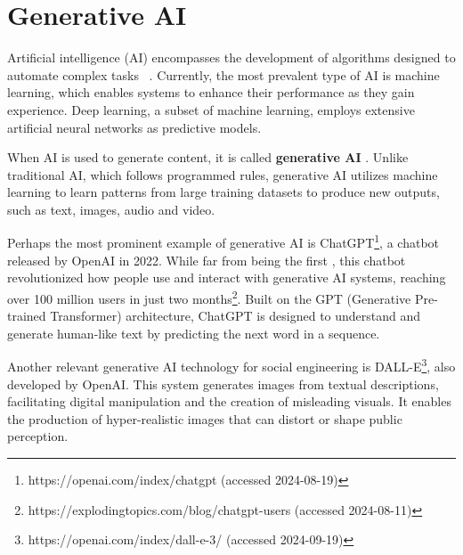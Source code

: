 \section{Generative AI}
\begin{comment}

Artificial Intelligence, Generative AI (ChatGPT, etc)

What to cover:
    - Mitä tekoäly oikeastaan edes on?
    - What is Generative AI
    - OpenAI releasing ChatGPT to the public in 2022
    - NLP Natural Language Processing
    
What to skip:
    - GPT:n historian (versiot 1, 2, 3, 3.5 jne) eli keskitytään vain GPT versioon 4 ja uudempiiin
    
\end{comment}

Artificial intelligence (AI) encompasses the development of algorithms designed to automate complex tasks ~\citep{mirsky_Threat_Offensive_AI_Organizations_2023}. Currently, the most prevalent type of AI is machine learning, which enables systems to enhance their performance as they gain experience. Deep learning, a subset of machine learning, employs extensive artificial neural networks as predictive models.

When AI is used to generate content, it is called \textbf{generative AI} \citep{goodfellow_Generative_Adversarial_Networks_2020}. Unlike traditional AI, which follows programmed rules, generative AI utilizes machine learning to learn patterns from large training datasets to produce new outputs, such as text, images, audio and video.

Perhaps the most prominent example of generative AI is ChatGPT\footnote{https://openai.com/index/chatgpt (accessed 2024-08-19)}, a chatbot released by OpenAI in 2022. While far from being the first \citep{weizenbaum_ELIZA_1996}, this chatbot revolutionized how people use and interact with generative AI systems, reaching over 100 million users in just two months\footnote{https://explodingtopics.com/blog/chatgpt-users (accessed 2024-08-11)}. Built on the GPT (Generative Pre-trained Transformer) architecture, ChatGPT is designed to understand and generate human-like text by predicting the next word in a sequence.

Another relevant generative AI technology for social engineering is DALL-E\footnote{https://openai.com/index/dall-e-3/ (accessed 2024-09-19)}, also developed by OpenAI. This system generates images from textual descriptions, facilitating digital manipulation and the creation of misleading visuals. It enables the production of hyper-realistic images that can distort or shape public perception.



